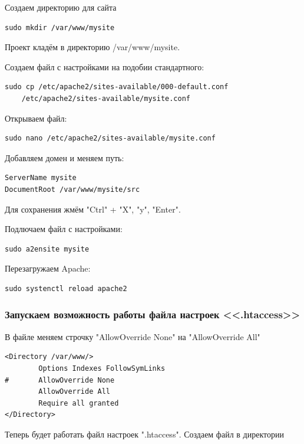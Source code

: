 Создаем директорию для сайта

\begin{verbatim}
sudo mkdir /var/www/mysite
\end{verbatim}

Проект кладём в директорию /var/www/mysite.

Создаем файл с настройками на подобии стандартного:

\begin{verbatim}
sudo cp /etc/apache2/sites-available/000-default.conf
    /etc/apache2/sites-available/mysite.conf
\end{verbatim}

Открываем файл:

\begin{verbatim}
sudo nano /etc/apache2/sites-available/mysite.conf
\end{verbatim}

Добавляем домен и меняем путь:

\begin{verbatim}
ServerName mysite
DocumentRoot /var/www/mysite/src
\end{verbatim}

Для сохранения жмём "Ctrl" + "X", "y", "Enter".

Подлючаем файл с настройками:

\begin{verbatim}
sudo a2ensite mysite
\end{verbatim}

Перезагружаем Apache:

\begin{verbatim}
sudo systenctl reload apache2
\end{verbatim}

\subsubsection{Запускаем возможность работы файла настроек <<.htaccess>>}

В файле меняем строчку "AllowOverride None" на "AllowOverride All"

\begin{verbatim}
<Directory /var/www/>
        Options Indexes FollowSymLinks
#       AllowOverride None
        AllowOverride All
        Require all granted
</Directory>
\end{verbatim}

Теперь будет работать файл настроек ".htaccess". Создаем файл в директории

